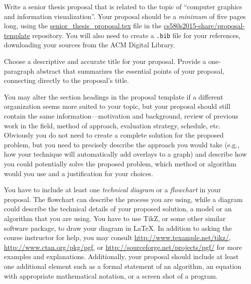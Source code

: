 

\usepackage{ulem}
\usepackage[compact]{titlesec}




Write a senior thesis proposal that is related to the topic of ``computer graphics and information visualization''.
Your proposal should be a {\em minimum} of five pages long, using the \url{senior_thesis_proposal.tex} file in the
\url{cs580s2015-share/proposal-template} repository.  You will also need to create a {\tt .bib} file for your
references, downloading your sources from the ACM Digital Library.

Choose a descriptive and accurate title for your proposal. Provide a one-paragraph abstract that summarizes the
essential points of your proposal, connecting directly to the proposal's title.

You may alter the section headings in the proposal template if a different organization seems more suited to your topic,
but your proposal should still contain the same information---motivation and background, review of previous work in the
field, method of approach, evaluation strategy, schedule, etc. Obviously you do not need to create a complete solution
for the proposed problem, but you need to precisely describe the approach you would take (e.g., how your technique will
automatically add overlays to a graph) and describe how you could potentially solve the proposed problem, which method
or algorithm would you use and a justification for your choices.

You have to include at least one {\em technical diagram} or a {\em flowchart} in your proposal. The flowchart can
describe the process you are using, while a diagram could describe the technical details of your proposed solution, a
model or an algorithm that you are using. You have to use TikZ, or some other similar software package, to draw your
diagram in \LaTeX. In addition to asking the course instructor for help, you may consult
\url{http://www.texample.net/tikz/}, \url{http://www.ctan.org/pkg/pgf}, or \url{http://sourceforge.net/projects/pgf/}
for more examples and explanations. Additionally, your proposal should include at least one additional element such as
a formal statement of an algorithm, an equation with appropriate mathematical notation, or a screen shot of a program.

